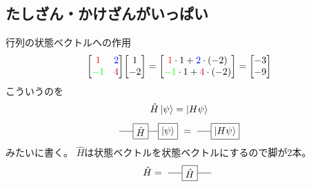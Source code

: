 \documentclass[dvipdfm]{beamer}
\begin{document}
\subsection{たしざん・かけざんがいっぱい}

\begin{frame}{行列の状態ベクトルへの作用}
    \begin{equation*}
        \mqty[\red{1} & \blue{2} \\ \green{-1} & \purple{4}]
        \mqty[1 \\ -2]
        =
        \mqty[
            \red{1}\cdot1+\blue{2}\cdot(-2)
            \\
            \green{-1}\cdot1+\purple{4}\cdot(-2)
        ]
        =
        \mqty[-3\\-9]
    \end{equation*}
    こういうのを
    \begin{equation*}
        \hat{H}\ket{\psi}
        =
        \ket{H\psi}
    \end{equation*}
    \begin{equation*}
        \vcenter{\hbox{
            \begin{tikzpicture}
                \node at(0,0)[draw, rectangle](H){$\hat{H}$};
                \node at(1,0)[draw, rectangle](psi){$\ket{\psi}$};
                \draw(H.east)--(psi.west)(H.west)--++(-.5,0);
            \end{tikzpicture}
        }}
        =
        \vcenter{\hbox{
            \begin{tikzpicture}
                \node at(1,0)[draw, rectangle](psi){$\ket{H\psi}$};
                \draw(psi.west)--++(-.5,0);
            \end{tikzpicture}
        }}
    \end{equation*}
    みたいに書く。
    $\hat{H}$は状態ベクトルを状態ベクトルにするので脚が2本。
    \begin{equation*}
        \hat{H}
        =
        \vcenter{\hbox{
            \begin{tikzpicture}
                \node at(0,0)[draw,rectangle](H){$\hat{H}$};
                \draw(H.east)--++(.5,0);
                \draw(H.west)--++(-.5,0);
            \end{tikzpicture}
        }}
    \end{equation*}
\end{frame}
\end{document}
